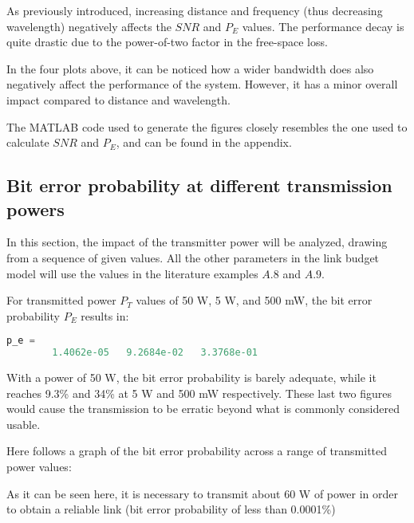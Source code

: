 
As previously introduced, increasing distance and frequency (thus decreasing wavelength) negatively affects the $SNR$ and $P_E$ values.
The performance decay is quite drastic due to the power-of-two factor in the free-space loss.



In the four plots above, it can be noticed how a wider bandwidth does also negatively affect the performance of the system.
However, it has a minor overall impact compared to distance and wavelength.

The MATLAB code used to generate the figures closely resembles the one used to calculate $SNR$ and $P_E$, and can be found in the appendix.


\subsection{Bit error probability at different transmission powers}
In this section, the impact of the transmitter power will be analyzed, drawing from a sequence of given values.
All the other parameters in the link budget model will use the values in the literature examples $A.8$ and $A.9$.

For transmitted power $P_T$ values of 50 W, 5 W, and 500 mW, the bit error probability $P_E$ results in:

\begin{lstlisting}[language=Octave]
    p_e =
        1.4062e-05   9.2684e-02   3.3768e-01
\end{lstlisting}

With a power of 50 W, the bit error probability is barely adequate, while it reaches 9.3\% and 34\% at 5 W and 500  mW respectively.
These last two figures would cause the transmission to be erratic beyond what is commonly considered usable.

Here follows a graph of the bit error probability across a range of transmitted power values:


As it can be seen here, it is necessary to transmit about 60 W of power in order to obtain a reliable link (bit error probability of less than 0.0001\%)


